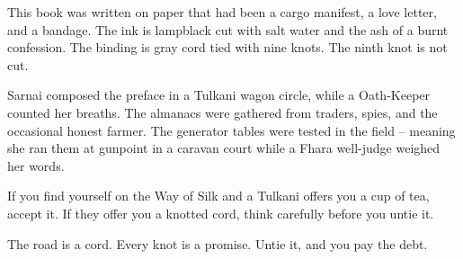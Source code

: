 \documentclass[12pt,oneside]{book}
\begin{document}
This book was written on paper that had been a cargo manifest, a love letter, and a bandage. The ink is lampblack cut with salt water and the ash of a burnt confession. The binding is gray cord tied with nine knots. The ninth knot is not cut.

Sarnai composed the preface in a Tulkani wagon circle, while a Oath-Keeper counted her breaths. The almanacs were gathered from traders, spies, and the occasional honest farmer. The generator tables were tested in the field -- meaning she ran them at gunpoint in a caravan court while a Fhara well-judge weighed her words.

If you find yourself on the Way of Silk and a Tulkani offers you a cup of tea, accept it. If they offer you a knotted cord, think carefully before you untie it.

The road is a cord. Every knot is a promise. Untie it, and you pay the debt.
\end{document}

